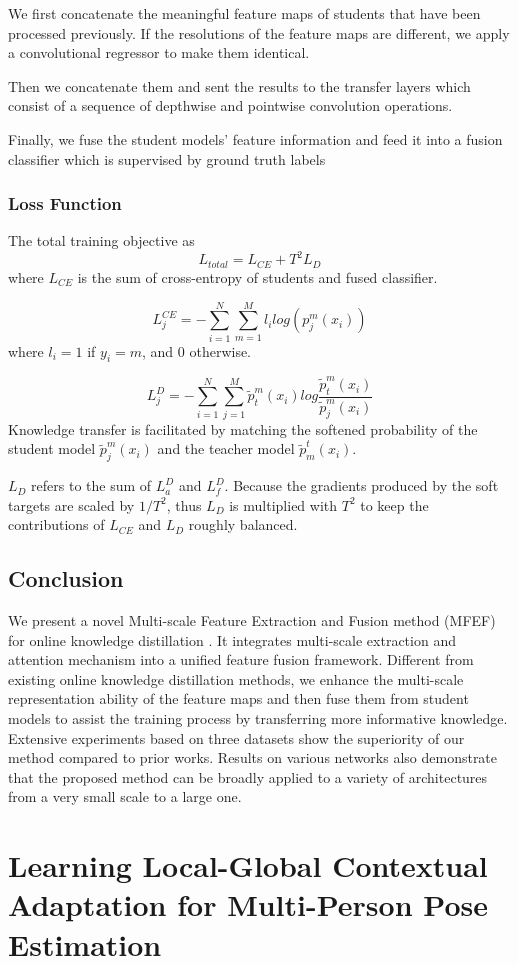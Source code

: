 \documentclass[11pt]{article}
\begin{document}
We first concatenate the meaningful feature maps of students that have been processed previously. If the resolutions of the feature maps are different, we apply a convolutional regressor to make them identical. 

Then we concatenate them and sent the results to the transfer layers which consist
of a sequence of depthwise and pointwise convolution operations. 

Finally, we fuse the student models’ feature information and feed it into a fusion classifier which is supervised by ground truth labels
\subsubsection{Loss Function}
The total training objective as 
$$L_{total} = L_{CE} + T^2L_D$$
where $L_{CE}$ is the sum of cross-entropy of students and fused classifier.

$$L_j^{CE} = -\sum_{i=1}^{N}\sum_{m=1}^{M}l_ilog(p_j^m(x_i))$$
where $l_i=1$ if $y_i=m$, and 0 otherwise.

$$L_j^{D} = -\sum_{i=1}^{N}\sum_{j=1}^{M}\tilde{p}^m_t(x_i)log\frac{\tilde{p}^m_t(x_i)}{\tilde{p}^m_j(x_i)}$$
Knowledge transfer is facilitated by matching the softened probability of the student model $\tilde{p}^m_j(x_i)$ and the teacher model $\tilde{p}^t_m(x_i)$.

$L_D$ refers to the sum of $L^D_a$ and $L^D_f$. Because the gradients produced by the soft targets are scaled by $1/T^2$, thus $L_D$ is multiplied with $T^2$ to keep the contributions of $L_{CE}$ and $L_D$ roughly balanced.
\subsection{Conclusion}
We present a novel Multi-scale Feature Extraction and Fusion method (MFEF) for online knowledge distillation . It integrates multi-scale extraction and attention mechanism into a unified feature fusion framework. Different from existing online knowledge distillation methods, we enhance the multi-scale representation ability of the feature maps and then fuse them from student models to assist the training process by transferring more informative knowledge. Extensive experiments based on three datasets show the superiority of our method compared to prior works. Results on various networks also demonstrate that the proposed method can be broadly applied to a variety of architectures from a very small scale to a large one.
\section{Learning Local-Global Contextual Adaptation for Multi-Person Pose Estimation}
\end{document}
